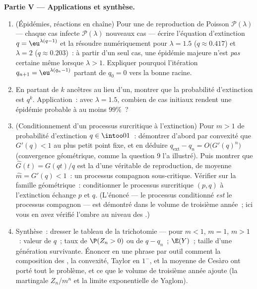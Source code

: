 \begin{problem}
\medskip
\noindent\textbf{Partie V --- Applications et synthèse.}
\begin{enumerate}[resume]
  \item (Épidémies, réactions en chaîne) Pour une  de reproduction
        de Poisson $\mathcal P(\lambda)$ --- chaque cas infecte
        $\mathcal P(\lambda)$ nouveaux cas --- écrire l'équation
        d'extinction $q = \eu^{\lambda(q-1)}$ et
        la résoudre numériquement pour $\lambda = 1.5$ ($q \approx
        0.417$) et $\lambda = 2$ ($q \approx 0.203$)~:
        à partir d'un seul cas, une épidémie majeure n'est
        \emph{pas} certaine même lorsque $\lambda > 1$. Expliquer
        pourquoi l'itération $q_{n+1} = \eu^{\lambda(q_n - 1)}$
        partant de $q_0 = 0$  vers la bonne racine.
  \item En partant de $k$ ancêtres au lieu d'un, montrer que
        la probabilité d'extinction est $q^k$. Application~:
        avec $\lambda = 1.5$, combien de cas initiaux rendent une
        épidémie probable à au moins $99\%$~?
  \item (Conditionnement d'un processus surcritique à l'extinction)
        Pour $m > 1$ de probabilité d'extinction $q \in
        \intoo01$~: démontrer d'abord par convexité que $G'(q) < 1$
        au plus petit point fixe, et en déduire
        $q_{\mathrm{ext}} - q_n = O\bigl(G'(q)^n\bigr)$
        (convergence géométrique, comme la question 9 l'a illustré).
        Puis montrer que $\widehat G(t) = G(qt)/q$ est la  d'une véritable  de reproduction, de moyenne
        $\widehat m = G'(q) < 1$~: un processus compagnon
        sous-critique. Vérifier
        sur la famille géométrique~: conditionner le
        processus surcritique $(p, q)$ à l'extinction échange $p$
        et $q$. (L'énoncé  --- le processus conditionné
        \emph{est} le processus compagnon --- est démontré
        dans le volume de troisième année~; ici vous en avez vérifié
        l'ombre au niveau des .)
  \item Synthèse~: dresser le tableau de la trichotomie --- pour $m <
        1$, $m = 1$, $m > 1$~: valeur de $q$~; taux de $\P(Z_n >
        0)$ ou de $q - q_n$~; $\E(Y)$~; taille d'une génération
        survivante. Énoncer en une phrase par outil comment la
        composition des , la convexité, Taylor
        en $1^-$, et la moyenne de Cesàro ont porté tout le problème,
        et ce que le volume de troisième année ajoute (la martingale
        $Z_n/m^n$ et la  limite exponentielle de Yaglom).
\end{enumerate}
\end{problem}
